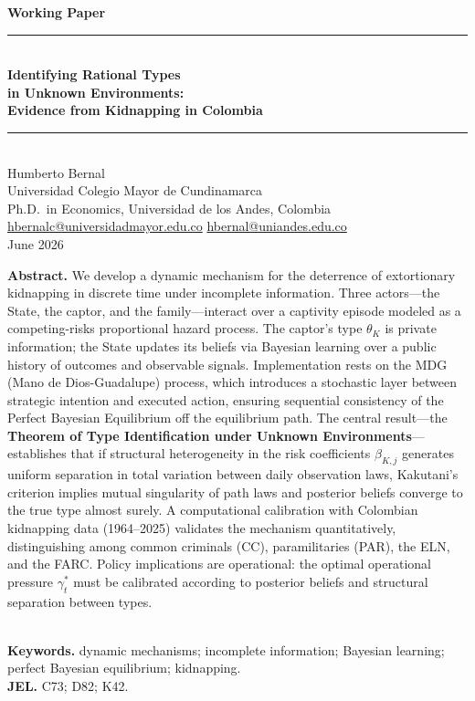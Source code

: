 \documentclass[12pt]{article}
\theoremstyle{definition}
\theoremstyle{remark}
\newcommand{\1}{\mathbf{1}}
\begin{document}
\begin{titlepage}
\begin{center}
  \vspace*{1.5cm}
  {\large\bfseries Working Paper}\\[0.4cm]
  \rule{\linewidth}{0.8pt}\\[0.6cm]
  {\LARGE\bfseries Identifying Rational Types\\
  in Unknown Environments:\\[0.3cm]
  \Large Evidence from Kidnapping in Colombia}\\[0.6cm]
  \rule{\linewidth}{0.8pt}\\[1cm]
  {\large Humberto Bernal}\\[0.3cm]
  {\normalsize Universidad Colegio Mayor de Cundinamarca\\
  Ph.D.\ in Economics, Universidad de los Andes, Colombia\\[0.2cm]
  \href{mailto:hbernalc@universidadmayor.edu.co}{hbernalc@universidadmayor.edu.co}\quad
  \href{mailto:hbernal@uniandes.edu.co}{hbernal@uniandes.edu.co}}\\[1.5cm]
  {\normalsize June 2026}\\[2cm]
  \begin{minipage}{0.85\textwidth}
    \small\textbf{Abstract.} We develop a dynamic mechanism for the deterrence of extortionary kidnapping in discrete time under incomplete information. Three actors---the State, the captor, and the family---interact over a captivity episode modeled as a competing-risks proportional hazard process. The captor's type $\theta_K$ is private information; the State updates its beliefs via Bayesian learning over a public history of outcomes and observable signals. Implementation rests on the MDG (Mano de Dios-Guadalupe) process, which introduces a stochastic layer between strategic intention and executed action, ensuring sequential consistency of the Perfect Bayesian Equilibrium off the equilibrium path. The central result---the \textbf{Theorem of Type Identification under Unknown Environments}---establishes that if structural heterogeneity in the risk coefficients $\beta_{K,j}$ generates uniform separation in total variation between daily observation laws, Kakutani's criterion implies mutual singularity of path laws and posterior beliefs converge to the true type almost surely. A computational calibration with Colombian kidnapping data (1964--2025) validates the mechanism quantitatively, distinguishing among common criminals (CC), paramilitaries (PAR), the ELN, and the FARC. Policy implications are operational: the optimal operational pressure $\gamma_t^\ast$ must be calibrated according to posterior beliefs and structural separation between types.
  \end{minipage}\\[1cm]
  {\small\textbf{Keywords.} dynamic mechanisms; incomplete information; Bayesian learning; perfect Bayesian equilibrium; kidnapping.}\\[0.3cm]
  {\small\textbf{JEL.} C73; D82; K42.}
\end{center}
\end{titlepage}
\end{document}
